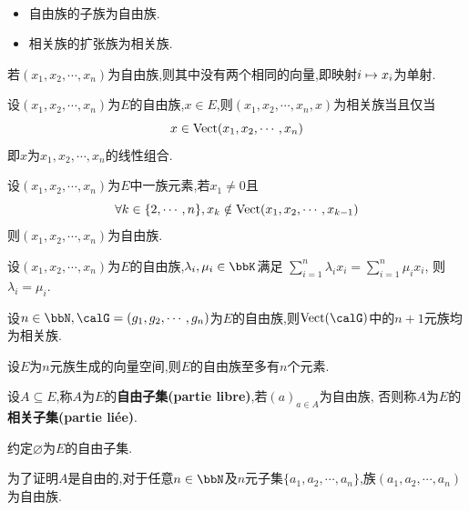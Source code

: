 \begin{prop} $\ $
    \begin{itemize}
        \item 自由族的子族为自由族.
        \item 相关族的扩张族为相关族.
    \end{itemize}
\end{prop}

\begin{rqq}
    若$(x_1, x_2, \cdots, x_n)$为自由族,则其中没有两个相同的向量,即映射$i \mapsto x_i$为单射.
\end{rqq}

\begin{prop}
    设$(x_1, x_2, \cdots, x_n)$为$E$的自由族,$x \in E$,则$(x_1, x_2, \cdots, x_n, x)$为相关族当且仅当
    \[ x \in \operatorname{Vect}(x_1, x_2, \cdots, x_n) \]即$x$为$x_1, x_2, \cdots, x_n$的线性组合.
\end{prop}

\begin{rqq}
    设$(x_1, x_2, \cdots, x_n)$为$E$中一族元素,若$x_1 \neq 0$且
    \[ \forall k \in \{ 2, \cdots, n \}, x_k \notin \operatorname{Vect}(x_1, x_2, \cdots, x_{k-1}) \]
    则$(x_1, x_2, \cdots, x_n)$为自由族.
\end{rqq}

\begin{thm}
    设$(x_1, x_2, \cdots, x_n)$为$E$的自由族,$\lambda_i, \mu_i \in \bbK$满足
    $\sum\limits_{i = 1}^n \lambda_i x_i = \sum\limits_{i = 1}^n \mu_i x_i$,
    则$\lambda_i = \mu_i$.
\end{thm}

\begin{prop}
    设$n \in \bbN, \calG = (g_1, g_2, \cdots, g_n)$为$E$的自由族,则$\vect(\calG)$中的$n + 1$元族均为相关族.
\end{prop}

\begin{cor}
    设$E$为$n$元族生成的向量空间,则$E$的自由族至多有$n$个元素.
\end{cor}

\begin{deff}
    设$A \subseteq E$,称$A$为$E$的\textbf{自由子集(partie libre)},若$(a)_{a \in A}$为自由族,
    否则称$A$为$E$的\textbf{相关子集(partie liée)}.
\end{deff}

\begin{rqq}
    约定$\varnothing$为$E$的自由子集.
\end{rqq}

\begin{rqq}
    为了证明$A$是自由的,对于任意$n \in \bbN$及$n$元子集$\{ a_1, a_2, \cdots, a_n \}$,族$(a_1, a_2, \cdots, a_n)$为自由族.
\end{rqq}

